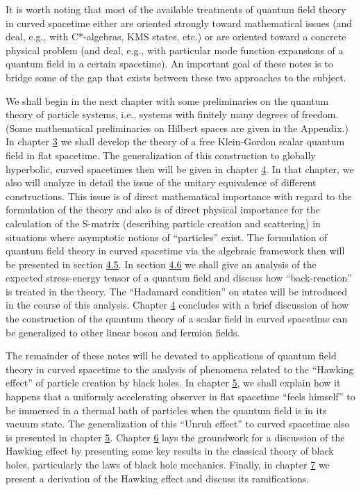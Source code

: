 \documentclass[11pt,a4paper]{article}
\begin{document}
It is worth noting that most of the available treatments of quantum field theory in curved spacetime either are oriented strongly toward mathematical issues (and deal, e.g., with C*-algebras, KMS states, etc.) or are oriented toward a concrete physical problem (and deal, e.g., with particular mode function expansions of a quantum field in a certain spacetime). An important goal of these notes is to bridge some of the gap that exists between these two approaches to the subject.

We shall begin in the next chapter with some preliminaries on the quantum theory of particle systems, i.e., systems with finitely many degrees of freedom. (Some mathematical preliminaries on Hilbert spaces are given in the Appendix.) In chapter \hyperlink{sec:3}{3} we shall \hypertarget{source-19}{}develop the theory of a free Klein-Gordon scalar quantum field in flat spacetime. The generalization of this construction to globally hyperbolic, curved spacetimes then will be given in chapter \hyperlink{sec:4}{4}. In that chapter, we also will analyze in detail the issue of the unitary equivalence of different constructions. This issue is of direct mathematical importance with regard to the formulation of the theory and also is of direct physical importance for the calculation of the S-matrix (describing particle creation and scattering) in situations where asymptotic notions of ``particles'' exist. The formulation of quantum field theory in curved spacetime via the algebraic framework then will be presented in section \hyperlink{sec:4.5}{4.5}. In section \hyperlink{sec:4.6}{4.6} we shall give an analysis of the expected stress-energy tensor of a quantum field and discuss how ``back-reaction'' is treated in the theory. The ``Hadamard condition'' on states will be introduced in the course of this analysis. Chapter \hyperlink{sec:4}{4} concludes with a brief discussion of how the construction of the quantum theory of a scalar field in curved spacetime can be generalized to other linear boson and fermion fields.

The remainder of these notes will be devoted to applications of quantum field theory in curved spacetime to the analysis of phenomena related to the ``Hawking effect'' of particle creation by black holes. In chapter \hyperlink{sec:5}{5}, we shall explain how it happens that a uniformly accelerating observer in flat spacetime ``feels himself'' to be immersed in a thermal bath of particles when the quantum field is in its vacuum state. The generalization of this ``Unruh effect'' to curved spacetime also is presented in chapter \hyperlink{sec:5}{5}. Chapter \hyperlink{sec:6}{6} lays the groundwork for a discussion of the Hawking effect by presenting some key results in the classical theory of black holes, particularly the laws of black hole mechanics. Finally, in chapter \hyperlink{sec:7}{7} we present a derivation of the Hawking effect and discuss its ramifications.
\end{document}
